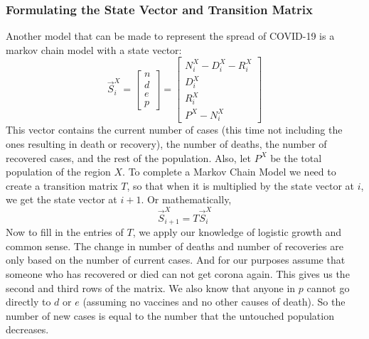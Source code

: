 \documentclass{report}
\begin{document}
            \subsubsection{Formulating the State Vector and Transition Matrix}
                Another model that can be made to represent the spread of COVID-19 is a markov chain model with a state vector:
                \begin{equation}
                    \vec{S}^X_i = \begin{bmatrix}
                        n \\
                        d \\
                        e \\
                        p
                    \end{bmatrix} = \begin{bmatrix}
                        N^X_i - D^X_i - R^X_i\\
                        D^X_i \\
                        R^X_i \\
                        P^X - N^X_i
                    \end{bmatrix}
                \end{equation}
                This vector contains the current number of cases (this time not including the ones resulting in death or recovery), the number of deaths, the number of recovered cases, and the rest of the population. Also, let $P^X$ be the total population of the region $X$.
                \newline\indent
                To complete a Markov Chain Model we need to create a transition matrix $T$, so that when it is multiplied by the state vector at $i$, we get the state vector at $i + 1$. Or mathematically,
                \begin{equation}
                    \vec{S}^X_{i + 1} = T\vec{S}^X_i
                \end{equation}
                Now to fill in the entries of $T$, we apply our knowledge of logistic growth and common sense. The change in number of deaths and number of recoveries are only based on the number of current cases. And for our purposes assume that someone who has recovered or died can not get corona again. This gives us the second and third rows of the matrix. We also know that anyone in $p$ cannot go directly to $d$ or $e$ (assuming no vaccines and no other causes of death). So the number of new cases is equal to the number that the untouched population decreases.
\end{document}
